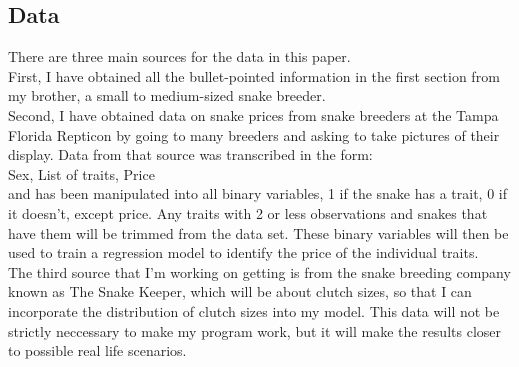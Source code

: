 \documentclass{paper}
\begin{document}
\begin{spacing}{1.5}
   \section*{Data}
   	There are three main sources for the data in this paper.\\First, I have obtained all the bullet-pointed information in the first section from my brother, a small to medium-sized snake breeder. \\Second, I have obtained data on snake prices from snake breeders at the Tampa Florida Repticon by going to many breeders and asking to take pictures of their display. Data from that source was transcribed in the form:\\
   	Sex, List of traits, Price\\
   	and has been manipulated into all binary variables, 1 if the snake has a trait, 0 if it doesn't, except price. Any traits with 2 or less observations and snakes that have them will be trimmed from the data set. These binary variables will then be used to train a regression model to identify the price of the individual traits.\\
   	The third source that I'm working on getting is from the snake breeding company known as The Snake Keeper, which will be about clutch sizes, so that I can incorporate the distribution of clutch sizes into my model. This data will not be strictly neccessary to make my program work, but it will make the results closer to possible real life scenarios.

\end{spacing}
\end{document}

